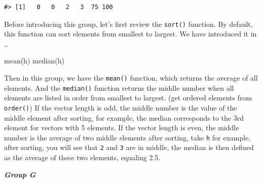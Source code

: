 \documentclass[
]{book}
\newenvironment{Shaded}{\begin{snugshade}}{\end{snugshade}}
\newcommand{\FunctionTok}[1]{\textcolor[rgb]{0.00,0.00,0.00}{#1}}
\newcommand{\NormalTok}[1]{#1}
\begin{document}
\begin{verbatim}
#> [1]   0   0   2   3  75 100
\end{verbatim}

Before introducing this group, let's first review the \texttt{sort()} function. By default, this function can sort elements from smallest to largest. We have introduced it in \ldots{}

\begin{Shaded}
\begin{Highlighting}[]
\FunctionTok{mean}\NormalTok{(h)}
\FunctionTok{median}\NormalTok{(h)}
\end{Highlighting}
\end{Shaded}

Then in this group, we have the \texttt{mean()} function, which returns the average of all elements. And the \texttt{median()} function returns the middle number when all elements are listed in order from smallest to largest. (get ordered elements from \texttt{order()}) If the vector length is odd, the middle number is the value of the middle element after sorting, for example, the median corresponds to the 3rd element for vectors with 5 elements. If the vector length is even, the middle number is the average of two middle elements after sorting, take \texttt{h} for example, after sorting, you will see that \texttt{2} and \texttt{3} are in middle, the median is then defined as the average of these two elements, equaling 2.5.

\textbf{\emph{Group G}}
\end{document}
